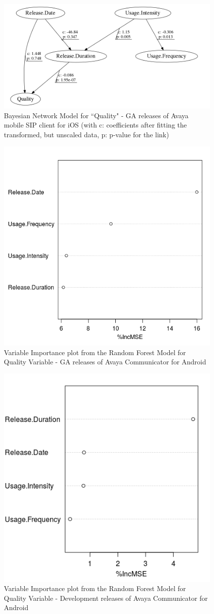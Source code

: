 \documentclass[smallextended]{svjour3}       %
\begin{document}
\begin{figure}[!t]
\centering
\includegraphics[width=0.7\linewidth]{qI}%
\caption{Bayesian Network  Model for ``Quality" - GA releases of Avaya mobile SIP client for iOS (with c: coefficients after fitting the transformed, but unscaled data, p: p-value  for the link)}
\label{fig:bn2I}
\end{figure}


\begin{figure}[!t]
\centering
\includegraphics[width=0.5\linewidth]{rfqAGA}
\caption{Variable Importance plot from the Random Forest  Model for Quality Variable - GA releases of Avaya Communicator for Android}
\label{fig:rf2AGA}
\end{figure}

\begin{figure}[!t]
\centering
\includegraphics[width=0.5\linewidth]{rfqAD}
\caption{Variable Importance plot from the Random Forest  Model for Quality Variable - Development releases of Avaya Communicator for Android}
\label{fig:rf2AD}
\end{figure}
\end{document}
